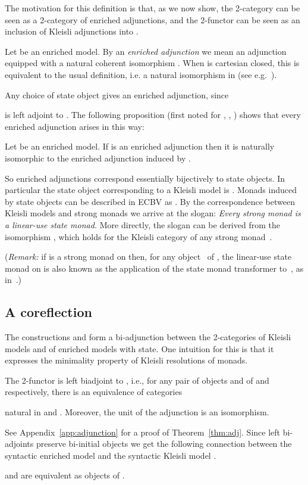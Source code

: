 \documentclass{LMCS}
\newcommand{\ECBV}{ECBV}
\begin{document}
The motivation for this definition is that, as we now show, the 2-category  can be seen as a 
2-category of enriched adjunctions, and the 2-functor  can be seen as an inclusion of
Kleisli adjunctions into . 

Let  be an enriched model. By an \emph{enriched adjunction} we mean 
an adjunction  equipped with a natural 
coherent isomorphism
.
When  is cartesian closed, this is equivalent to
the usual definition, i.e. a natural isomorphism
 in  (see e.g.~\cite{kelly-enrichedadj}). 

Any choice of state object gives an enriched adjunction,
since
 
is left adjoint to  .
The following proposition (first noted for , \cite[Proof of Thm.~4]{Mogelberg:CSL:09}, \cite{EEC:journal}) shows that every enriched adjunction arises in this way:
\begin{prop}
\label{prop:adjmodels}
Let  be an enriched model.
If  is an enriched adjunction
then it is naturally isomorphic to
the enriched adjunction induced by .
\end{prop}
So enriched adjunctions correspond essentially bijectively 
to state objects.
In particular the state object corresponding to a Kleisli model is . 
Monads induced by state objects can be described in {\ECBV} as .
By the correspondence between Kleisli models and strong monads we arrive at the slogan: 
\emph{Every strong monad is a linear-use state monad.} 
More directly, the slogan can be derived from the 
isomorphism , which holds for 
the Kleisli category  of any strong monad~. 


(\emph{Remark:} if  is a strong monad on 
then, for any object~ of , 
the linear-use state monad 
 on  is also known as the
application of the state monad transformer to~, as in~\cite{lhj-monad-transformers}.)



\subsection{A coreflection}
\label{sec:adj}

The constructions  and  form a bi-adjunction
between the 2-categories of Kleisli models and of enriched models
with state. One intuition for this is that it expresses the minimality
property of Kleisli resolutions of monads.

\begin{thm} \label{thm:adj} The 2-functor  is left biadjoint to , i.e., for any
  pair of objects  and  of  and  respectively, there is an
  equivalence of categories
  
natural in   and . 
Moreover, the unit of the adjunction  is an isomorphism.
\end{thm}
See Appendix~\ref{app:adjunction} for a proof of Theorem~\ref{thm:adj}. Since left bi-adjoints preserve 
bi-initial objects we get the following
connection between the syntactic enriched model
 and the syntactic Kleisli model .
\begin{cor} \label{cor:eq:syn:models}
 and  are equivalent as objects of . 
\end{cor}
\end{document}
